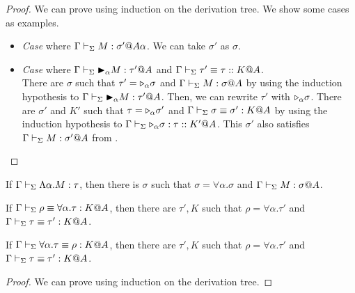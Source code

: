 \begin{proof}
	We can prove using induction on the derivation tree.
	We show some cases as examples.
				
\begin{itemize}
	\item \textit{Case} \TTB{} where \(\Gamma \vdash_\Sigma M : \sigma'@A\alpha\).
		  We can take $\sigma'$ as $\sigma$.	      	      		      	      	      	      	      
	\item \textit{Case} \TConv{} where \( \Gamma \vdash_\Sigma {\mathop{\blacktriangleright}}_\alpha M : \tau'@A \) and \( \Gamma\vdash_\Sigma\tau' \equiv \tau :: K@A \).\\
		  There are $\sigma$ such that $\tau' = {\mathop{\triangleright}}_\alpha \sigma$ and $\G \V M : \sigma@A$
		  by using the induction hypothesis to \( \Gamma \vdash_\Sigma {\mathop{\blacktriangleright}}_\alpha M : \tau' @A\).
		  Then, we can rewrite $\tau'$ with ${\mathop{\triangleright}}_\alpha \sigma$.
		  There are $\sigma'$ and $K'$ such that $\tau = {\mathop{\triangleright}}_\alpha \sigma'$ and $\Gamma \vdash_\Sigma \sigma \equiv \sigma' : K @ A$
		  by using the induction hypothesis to \( \Gamma \vdash_\Sigma {\mathop{\triangleright}}_\alpha \sigma : \tau :: K' @A\).
		  This $\sigma'$ also satisfies $\Gamma \vdash_\Sigma M : \sigma' @ A $ from \TConv.
\end{itemize}
\end{proof}	

\begin{lemma}
	\begin{item}
	      \item If $\Gamma \vdash_\Sigma \Lambda\alpha.M : \tau$, then 
	      there is $\sigma$ such that $\sigma = \forall\alpha.\sigma$ and $\G \V M : \sigma@A$.%
	      \item If $\Gamma \vdash_\Sigma \rho \equiv \forall\alpha.\tau : K @A$, then there are $\tau', K$ such that
	      $\rho = \forall\alpha.\tau'$ and $\Gamma \vdash_\Sigma \tau \equiv \tau' : K @A$.
	      \item If $\Gamma \vdash_\Sigma \forall\alpha.\tau \equiv \rho : K @A$, then there are $\tau', K$ such that
	      $\rho = \forall\alpha.\tau'$ and $\Gamma \vdash_\Sigma \tau \equiv \tau' : K @A$.
	\end{item}
\end{lemma}

\begin{proof}
	We can prove using induction on the derivation tree.
		
\end{proof}
		
